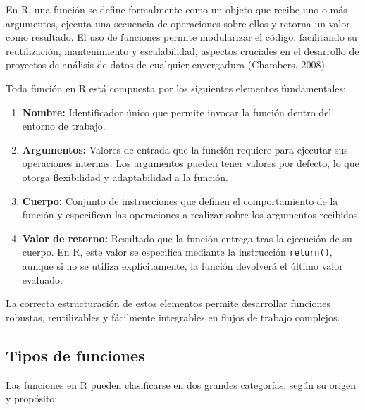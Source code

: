 \documentclass[
  spanish,
  a4paper,
  DIV=11,
  numbers=noendperiod,
  onepage,
  openany]{scrreprt}
\begin{document}
En R, una función se define formalmente como un objeto que recibe uno o
más argumentos, ejecuta una secuencia de operaciones sobre ellos y
retorna un valor como resultado. El uso de funciones permite modularizar
el código, facilitando su reutilización, mantenimiento y escalabilidad,
aspectos cruciales en el desarrollo de proyectos de análisis de datos de
cualquier envergadura (Chambers, 2008).

Toda función en R está compuesta por los siguientes elementos
fundamentales:

\begin{enumerate}
\def\labelenumi{\arabic{enumi}.}
\item
  \textbf{Nombre:} Identificador único que permite invocar la función
  dentro del entorno de trabajo.
\item
  \textbf{Argumentos:} Valores de entrada que la función requiere para
  ejecutar sus operaciones internas. Los argumentos pueden tener valores
  por defecto, lo que otorga flexibilidad y adaptabilidad a la función.
\item
  \textbf{Cuerpo:} Conjunto de instrucciones que definen el
  comportamiento de la función y especifican las operaciones a realizar
  sobre los argumentos recibidos.
\item
  \textbf{Valor de retorno:} Resultado que la función entrega tras la
  ejecución de su cuerpo. En R, este valor se especifica mediante la
  instrucción \texttt{return()}, aunque si no se utiliza explícitamente,
  la función devolverá el último valor evaluado.
\end{enumerate}

La correcta estructuración de estos elementos permite desarrollar
funciones robustas, reutilizables y fácilmente integrables en flujos de
trabajo complejos.

\subsection{Tipos de funciones}\label{tipos-de-funciones}

Las funciones en R pueden clasificarse en dos grandes categorías, según
su origen y propósito:
\end{document}
